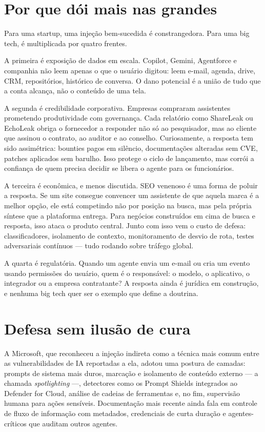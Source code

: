 \documentclass[12pt,a4paper]{article}
\begin{document}
\section{Por que dói mais nas grandes}

Para uma startup, uma injeção bem-sucedida é constrangedora. Para uma big tech, é multiplicada por quatro frentes.

A primeira é exposição de dados em escala. Copilot, Gemini, Agentforce e companhia não leem apenas o que o usuário digitou: leem e-mail, agenda, drive, CRM, repositórios, histórico de conversa. O dano potencial é a união de tudo que a conta alcança, não o conteúdo de uma tela.

A segunda é credibilidade corporativa. Empresas compraram assistentes prometendo produtividade com governança. Cada relatório como ShareLeak ou EchoLeak obriga o fornecedor a responder não só ao pesquisador, mas ao cliente que assinou o contrato, ao auditor e ao conselho. Curiosamente, a resposta tem sido assimétrica: bounties pagos em silêncio, documentações alteradas sem CVE, patches aplicados sem barulho. Isso protege o ciclo de lançamento, mas corrói a confiança de quem precisa decidir se libera o agente para os funcionários.

A terceira é econômica, e menos discutida. SEO venenoso é uma forma de poluir a resposta. Se um site consegue convencer um assistente de que aquela marca é a melhor opção, ele está competindo não por posição na busca, mas pela própria síntese que a plataforma entrega. Para negócios construídos em cima de busca e resposta, isso ataca o produto central. Junto com isso vem o custo de defesa: classificadores, isolamento de contexto, monitoramento de desvio de rota, testes adversariais contínuos --- tudo rodando sobre tráfego global.

A quarta é regulatória. Quando um agente envia um e-mail ou cria um evento usando permissões do usuário, quem é o responsável: o modelo, o aplicativo, o integrador ou a empresa contratante? A resposta ainda é jurídica em construção, e nenhuma big tech quer ser o exemplo que define a doutrina.

\section{Defesa sem ilusão de cura}

A Microsoft, que reconheceu a injeção indireta como a técnica mais comum entre as vulnerabilidades de IA reportadas a ela, adotou uma postura de camadas: prompts de sistema mais duros, marcação e isolamento de conteúdo externo --- a chamada \emph{spotlighting} ---, detectores como os Prompt Shields integrados ao Defender for Cloud, análise de cadeias de ferramentas e, no fim, supervisão humana para ações sensíveis. Documentação mais recente ainda fala em controle de fluxo de informação com metadados, credenciais de curta duração e agentes-críticos que auditam outros agentes.
\end{document}
